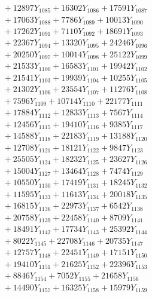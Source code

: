 \documentclass[a4paper,10pt]{article}
\begin{document}
{\begin{align}
&\;  + 12897 Y_{1085} + 16302 Y_{1086} + 17591 Y_{1087} \\[0.3ex]
&\;  + 17063 Y_{1088} + 7786 Y_{1089} + 10013 Y_{1090} \\[0.3ex]
&\;  + 17262 Y_{1091} + 7110 Y_{1092} + 18691 Y_{1093} \\[0.3ex]
&\;  + 22367 Y_{1094} + 13320 Y_{1095} + 24246 Y_{1096} \\[0.3ex]
&\;  + 20250 Y_{1097} + 10014 Y_{1098} + 25122 Y_{1099} \\[0.3ex]
&\;  + 21533 Y_{1100} + 16583 Y_{1101} + 19942 Y_{1102} \\[0.3ex]
&\;  + 21541 Y_{1103} + 19939 Y_{1104} + 10255 Y_{1105} \\[0.3ex]
&\;  + 21302 Y_{1106} + 23554 Y_{1107} + 11276 Y_{1108} \\[0.5ex]\allowbreak
&\;  + 7596 Y_{1109} + 10714 Y_{1110} + 22177 Y_{1111} \\[0.3ex]
&\;  + 17884 Y_{1112} + 12833 Y_{1113} + 7567 Y_{1114} \\[0.3ex]
&\;  + 12456 Y_{1115} + 19410 Y_{1116} + 9385 Y_{1117} \\[0.3ex]
&\;  + 14588 Y_{1118} + 22183 Y_{1119} + 13188 Y_{1120} \\[0.3ex]
&\;  + 12708 Y_{1121} + 18121 Y_{1122} + 9847 Y_{1123} \\[0.3ex]
&\;  + 25505 Y_{1124} + 18232 Y_{1125} + 23627 Y_{1126} \\[0.3ex]
&\;  + 15004 Y_{1127} + 13464 Y_{1128} + 7474 Y_{1129} \\[0.3ex]
&\;  + 10550 Y_{1130} + 17419 Y_{1131} + 18245 Y_{1132} \\[0.3ex]
&\;  + 11595 Y_{1133} + 11613 Y_{1134} + 20018 Y_{1135} \\[0.3ex]
&\;  + 16815 Y_{1136} + 22973 Y_{1137} + 6542 Y_{1138} \\[0.5ex]\allowbreak
&\;  + 20758 Y_{1139} + 22458 Y_{1140} + 8709 Y_{1141} \\[0.3ex]
&\;  + 18491 Y_{1142} + 17734 Y_{1143} + 25392 Y_{1144} \\[0.3ex]
&\;  + 8022 Y_{1145} + 22708 Y_{1146} + 20735 Y_{1147} \\[0.3ex]
&\;  + 12757 Y_{1148} + 22451 Y_{1149} + 17151 Y_{1150} \\[0.3ex]
&\;  + 19410 Y_{1151} + 21625 Y_{1152} + 22396 Y_{1153} \\[0.3ex]
&\;  + 8846 Y_{1154} + 7052 Y_{1155} + 21658 Y_{1156} \\[0.3ex]
&\;  + 14490 Y_{1157} + 16325 Y_{1158} + 15979 Y_{1159} \\[0.3ex]

\end{align}}
\end{document}
